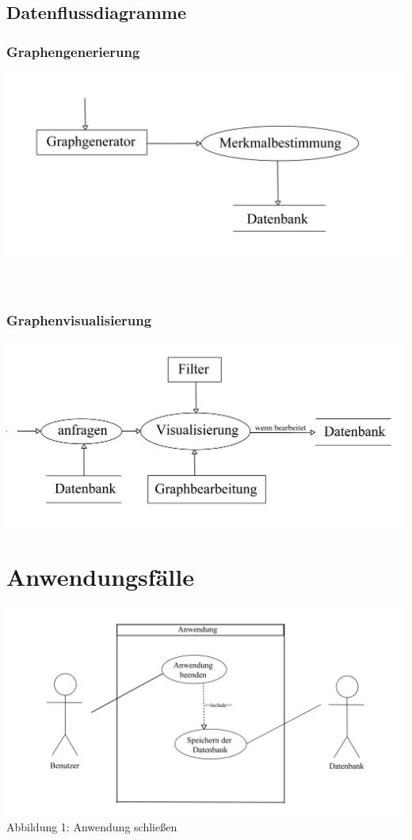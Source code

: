 \documentclass[13pt]{scrreprt}
\begin{document}
\section{Datenflussdiagramme}

\subsection{Graphengenerierung}
\includegraphics[scale=0.75]{Graphengenerierung_Datenflussdiagramm.jpg}
\\
\\
\\
\subsection{Graphenvisualisierung}
\includegraphics[scale=0.75]{Graphenvisualisierung_Datenflussdiagramm.jpg}

\chapter{Anwendungsfälle}

\includegraphics[scale=0.75]{Anwendung_schliessen.jpg}
\centering Abbildung 1: Anwendung schließen
\\
\ \\
\end{document}
